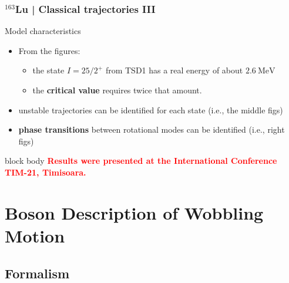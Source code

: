 \documentclass{beamer}
\begin{document}
\begin{frame}
	\frametitle{$^{163}$Lu | Classical trajectories III}
	\begin{exampleblock}{Model characteristics}
		\begin{itemize}
			\item From the figures:
			\begin{itemize}
				\item the state $I=25/2^+$ from TSD1 has a real energy of about $2.6\ \text{MeV}$
				\item the \textbf{critical value} requires twice that amount.
			\end{itemize}
			\item unstable trajectories can be identified for each state (i.e., the middle figs)
			\item \textbf{phase transitions} between rotational modes can be identified (i.e., right figs)
		\end{itemize}
	\end{exampleblock}
	\begin{beamercolorbox}[rounded=true,shadow=false, wd=\linewidth,]{block body}
		\centering
		\textcolor{red}{\footnotesize{\textbf{Results were presented at the International Conference TIM-21, Timisoara.}}}
	\end{beamercolorbox}
\end{frame}

\section{Boson Description of Wobbling Motion}

\subsection{Formalism}
\end{document}
